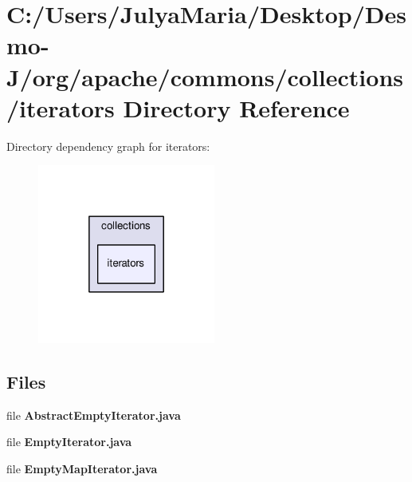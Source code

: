 \section{C\-:/\-Users/\-Julya\-Maria/\-Desktop/\-Desmo-\/\-J/org/apache/commons/collections/iterators Directory Reference}
\label{dir_2476cba6855235f7b64e2cfdeb91c4b7}
Directory dependency graph for iterators\-:
\nopagebreak
\begin{figure}[H]
\begin{center}
\leavevmode
\includegraphics[width=166pt]{dir_2476cba6855235f7b64e2cfdeb91c4b7_dep}
\end{center}
\end{figure}
\subsection*{Files}
\begin{DoxyCompactItemize}
\item 
file {\bfseries Abstract\-Empty\-Iterator.\-java}
\item 
file {\bfseries Empty\-Iterator.\-java}
\item 
file {\bfseries Empty\-Map\-Iterator.\-java}
\end{DoxyCompactItemize}

